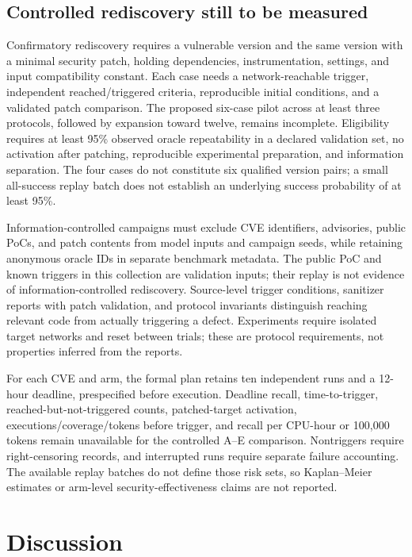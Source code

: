\documentclass[final,5p,times,number]{elsarticle}
\begin{document}
\subsection{Controlled rediscovery still to be measured}
Confirmatory rediscovery requires a vulnerable version and the same version with a minimal security patch, holding dependencies, instrumentation, settings, and input compatibility constant. Each case needs a network-reachable trigger, independent reached/triggered criteria, reproducible initial conditions, and a validated patch comparison. The proposed six-case pilot across at least three protocols, followed by expansion toward twelve, remains incomplete. Eligibility requires at least 95\% observed oracle repeatability in a declared validation set, no activation after patching, reproducible experimental preparation, and information separation. The four cases do not constitute six qualified version pairs; a small all-success replay batch does not establish an underlying success probability of at least 95\%.

Information-controlled campaigns must exclude CVE identifiers, advisories, public PoCs, and patch contents from model inputs and campaign seeds, while retaining anonymous oracle IDs in separate benchmark metadata. The public PoC and known triggers in this collection are validation inputs; their replay is not evidence of information-controlled rediscovery. Source-level trigger conditions, sanitizer reports with patch validation, and protocol invariants distinguish reaching relevant code from actually triggering a defect. Experiments require isolated target networks and reset between trials; these are protocol requirements, not properties inferred from the reports.

For each CVE and arm, the formal plan retains ten independent runs and a 12-hour deadline, prespecified before execution. Deadline recall, time-to-trigger, reached-but-not-triggered counts, patched-target activation, executions/coverage/tokens before trigger, and recall per CPU-hour or 100,000 tokens remain unavailable for the controlled A--E comparison. Nontriggers require right-censoring records, and interrupted runs require separate failure accounting. The available replay batches do not define those risk sets, so Kaplan--Meier estimates or arm-level security-effectiveness claims are not reported.

\section{Discussion}
\end{document}
